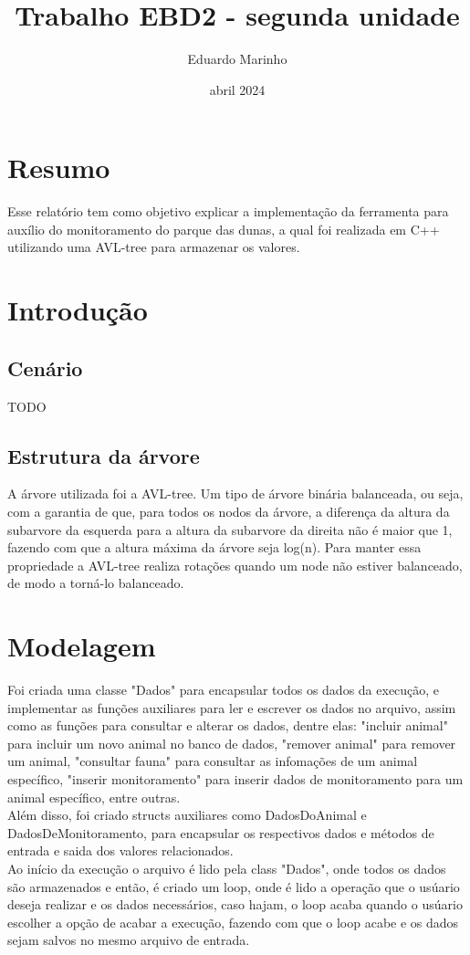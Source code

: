 \documentclass{article}
\title{Trabalho EBD2 - segunda unidade}
\author{Eduardo Marinho}
\date{abril 2024}
\begin{document}
\maketitle

\section{Resumo}
\leavevmode
\indent Esse relatório tem como objetivo explicar a implementação da ferramenta para 
auxílio do monitoramento do parque das dunas, a qual foi realizada em C++ utilizando 
uma AVL-tree para armazenar os valores.

\section{Introdução}
\subsection{Cenário}
\leavevmode
\indent TODO
\subsection{Estrutura da árvore}
\leavevmode
\indent A árvore utilizada foi a AVL-tree. Um tipo de árvore binária balanceada, ou seja,
com a garantia de que, para todos os nodos da árvore, a diferença da altura da subarvore
da esquerda para a altura da subarvore da direita não é maior que 1, fazendo com que a
altura máxima da árvore seja log(n). Para manter essa propriedade a AVL-tree realiza
rotações quando um node não estiver balanceado, de modo a torná-lo balanceado.

\section{Modelagem}
\leavevmode
\indent Foi criada uma classe "Dados" para encapsular todos os dados da execução, e implementar
as funções auxiliares para ler e escrever os dados no arquivo, assim como as funções
para consultar e alterar os dados, dentre elas: "incluir animal" para incluir um novo 
animal no banco de dados, "remover animal" para remover um animal, "consultar fauna"
para consultar as infomações de um animal específico, "inserir monitoramento" para 
inserir dados de monitoramento para um animal específico, entre outras. \\
\indent Além disso, foi criado structs auxiliares como DadosDoAnimal e DadosDeMonitoramento,
para encapsular os respectivos dados e métodos de entrada e saida dos valores relacionados.\\
\indent Ao início da execução o arquivo é lido pela class "Dados", onde todos os dados são
armazenados e então, é criado um loop, onde é lido a operação que o usúario deseja
realizar e os dados necessários, caso hajam, o loop acaba quando o usúario escolher
a opção de acabar a execução, fazendo com que o loop acabe e os dados sejam salvos
no mesmo arquivo de entrada.
\end{document}

